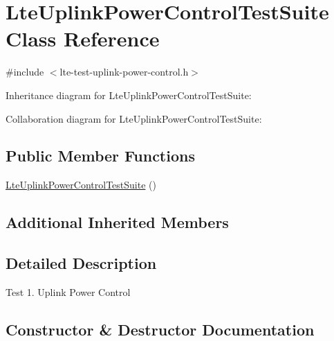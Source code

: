\hypertarget{classLteUplinkPowerControlTestSuite}{}\section{Lte\+Uplink\+Power\+Control\+Test\+Suite Class Reference}
\label{classLteUplinkPowerControlTestSuite}


{\ttfamily \#include $<$lte-\/test-\/uplink-\/power-\/control.\+h$>$}



Inheritance diagram for Lte\+Uplink\+Power\+Control\+Test\+Suite\+:


Collaboration diagram for Lte\+Uplink\+Power\+Control\+Test\+Suite\+:
\subsection*{Public Member Functions}
\begin{DoxyCompactItemize}
\item 
\hyperlink{classLteUplinkPowerControlTestSuite_a471979144cb812d0876698f1cd921b83}{Lte\+Uplink\+Power\+Control\+Test\+Suite} ()
\end{DoxyCompactItemize}
\subsection*{Additional Inherited Members}


\subsection{Detailed Description}
Test 1. Uplink Power Control 

\subsection{Constructor \& Destructor Documentation}
